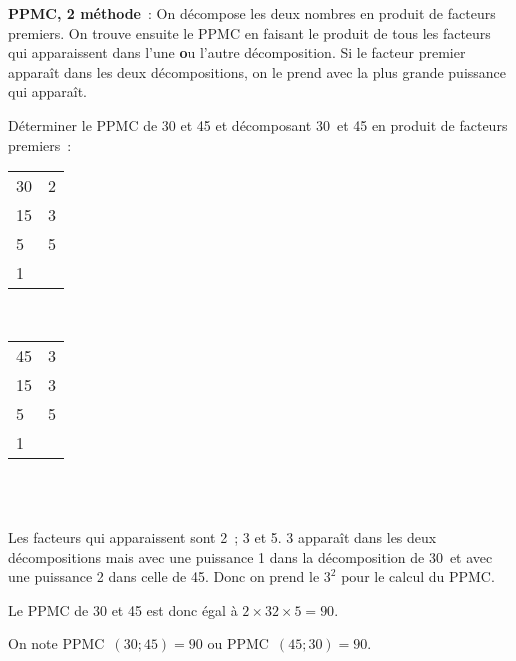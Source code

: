  
 
 



 
 
 
 
 \newpage
 
 
 \vspace{2em}

 
\begin{methode*1}

\textcolor{H1}{\textbf{PPMC, 2 méthode}} : On décompose les deux nombres en produit de facteurs premiers. On trouve ensuite le PPMC en faisant le produit de tous les facteurs qui apparaissent dans l'une {\textbf ou} l'autre décomposition. Si le facteur premier apparaît dans les deux décompositions, on le prend avec la plus grande puissance qui apparaît.

\begin{exemple*1}
Déterminer le PPMC de 30 et 45 et décomposant 30 et 45 en produit de facteurs premiers : \\[1em]
\begin{minipage}[t]{0.26\textwidth}
 \begin{tabularx}{0.3\textwidth}{X|X}
 30 & 2 \\ 
 15 & 3 \\
 5 & 5 \\
 1 & \\ 
 \end{tabularx} \\[1em]
\end{minipage} \hfill%
\begin{minipage}[t]{0.56\textwidth}
 \begin{tabularx}{0.3\textwidth}{X|X}
 45 & 3 \\ 
 15 & 3 \\
 5 & 5 \\
 1 & \\ 
 \end{tabularx} \\[1em]
 \end{minipage} \\
Les facteurs qui apparaissent sont 2 ; 3 et 5. 3 apparaît dans les deux décompositions mais avec une puissance 1 dans la décomposition de 30 et avec une puissance 2 dans celle de 45. Donc on prend le $3^2$ pour le calcul du PPMC.

Le PPMC de 30 et 45 est donc égal à $2 × 32 × 5 = 90$.

On note PPMC $(30 ; 45) = 90$ ou PPMC $(45 ; 30) = 90$. \\[-2em]
 \end{exemple*1}
 

\end{methode*1}

